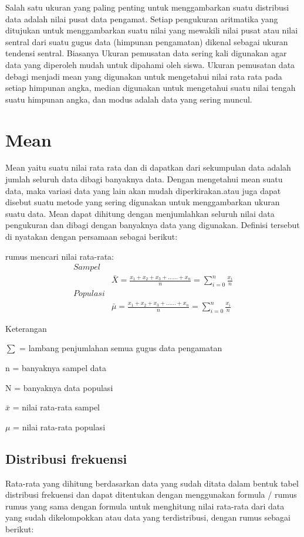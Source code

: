 \documentclass[11pt,fleqn]{book} %
\begin{document}
{Salah satu ukuran yang paling penting untuk menggambarkan suatu distribusi data adalah nilai pusat data pengamat. Setiap pengukuran aritmatika yang ditujukan untuk menggambarkan suatu nilai yang mewakili nilai pusat atau nilai sentral dari suatu gugus data (himpunan pengamatan) dikenal sebagai ukuran tendensi sentral. Biasanya Ukuran pemusatan data sering kali digunakan agar data yang diperoleh mudah untuk dipahami oleh siswa. Ukuran pemusatan data debagi menjadi mean yang digunakan untuk mengetahui nilai rata rata pada setiap himpunan angka, median digunakan untuk mengetahui suatu nilai tengah suatu himpunan angka, dan modus adalah data yang sering muncul.



\section{Mean}

Mean yaitu suatu nilai rata rata dan di dapatkan dari sekumpulan data adalah jumlah seluruh data dibagi banyaknya data. Dengan mengetahui mean suatu data, maka variasi data yang lain akan mudah diperkirakan.atau juga dapat disebut suatu metode yang sering digunakan untuk menggambarkan ukuran suatu data. Mean dapat dihitung dengan menjumlahkan seluruh nilai data pengukuran dan dibagi dengan banyaknya data yang digunakan. Definisi tersebut di nyatakan dengan persamaan sebagai berikut:

\begin{theorem}[Mean]
rumus mencari nilai rata-rata:
\begin{align}
Sampel\\
& \bar{X}=\frac{x_{1}+x_{2}+x_{3}+......+x_{n}}{n}=\sum_{i=0}^{n}\frac{x_{i}}{n}\\
Populasi\\
& \bar{\mu}=\frac{x_{1}+x_{2}+x_{3}+......+x_{n}}{n}=\sum_{i=0}^{n}\frac{x_{i}}{n}
\end{align}
\end{theorem}

Keterangan

$\sum$ = lambang penjumlahan semua gugus data pengamatan 

n = banyaknya sampel data 

N = banyaknya data populasi 

$\bar x$ = nilai rata-rata sampel

$\mu$ = nilai rata-rata populasi

\subsection{Distribusi frekuensi}
Rata-rata yang dihitung berdasarkan data yang sudah ditata dalam bentuk tabel distribusi frekuensi dan dapat ditentukan dengan menggunakan formula / rumus rumus yang sama dengan formula untuk menghitung nilai rata-rata dari data yang sudah dikelompokkan atau data yang terdistribusi, dengan rumus sebagai berikut:

}
\end{document}
